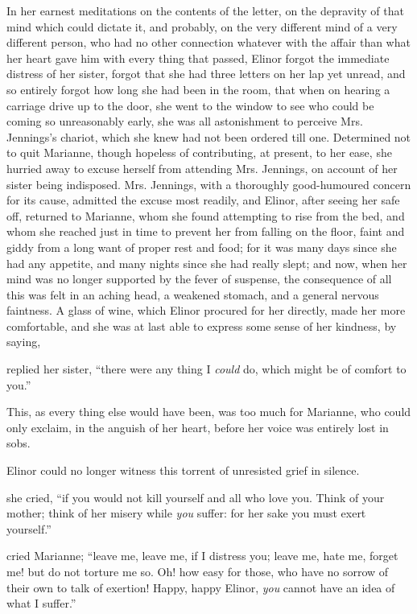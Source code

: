 In her earnest meditations on the contents of the letter, on the depravity of that mind which could dictate it, and probably, on the very different mind of a very different person, who had no other connection whatever with the affair than what her heart gave him with every thing that passed, Elinor forgot the immediate distress of her sister, forgot that she had three letters on her lap yet unread, and so entirely forgot how long she had been in the room, that when on hearing a carriage drive up to the door, she went to the window to see who could be coming so unreasonably early, she was all astonishment to perceive Mrs. Jennings's chariot, which she knew had not been ordered till one. Determined not to quit Marianne, though hopeless of contributing, at present, to her ease, she hurried away to excuse herself from attending Mrs. Jennings, on account of her sister being indisposed. Mrs. Jennings, with a thoroughly good-humoured concern for its cause, admitted the excuse most readily, and Elinor, after seeing her safe off, returned to Marianne, whom she found attempting to rise from the bed, and whom she reached just in time to prevent her from falling on the floor, faint and giddy from a long want of proper rest and food; for it was many days since she had any appetite, and many nights since she had really slept; and now, when her mind was no longer supported by the fever of suspense, the consequence of all this was felt in an aching head, a weakened stomach, and a general nervous faintness. A glass of wine, which Elinor procured for her directly, made her more comfortable, and she was at last able to express some sense of her kindness, by saying,


 replied her sister, “there were any thing I {\em could} do, which might be of comfort to you.”

This, as every thing else would have been, was too much for Marianne, who could only exclaim, in the anguish of her heart,  before her voice was entirely lost in sobs.

Elinor could no longer witness this torrent of unresisted grief in silence.

 she cried, “if you would not kill yourself and all who love you. Think of your mother; think of her misery while {\em you} suffer: for her sake you must exert yourself.”

 cried Marianne; “leave me, leave me, if I distress you; leave me, hate me, forget me! but do not torture me so. Oh! how easy for those, who have no sorrow of their own to talk of exertion! Happy, happy Elinor, {\em you} cannot have an idea of what I suffer.”


